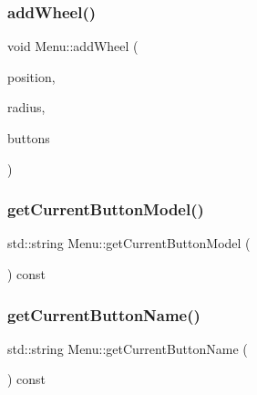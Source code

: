 \mbox{\label{class_menu_aaef68ff726b362a3807bfa0987430c69}} 
\subsubsection{\texorpdfstring{addWheel()}{addWheel()}\hspace{0.1cm}{\footnotesize\ttfamily [2/2]}}
{\footnotesize\ttfamily void Menu\+::add\+Wheel (\begin{DoxyParamCaption}\item[{const vector3df \&}]{position,  }\item[{const float \&}]{radius,  }\item[{const std\+::vector$<$ \mbox{\hyperlink{struct_wheel_1_1_param_button}{Wheel\+::\+Param\+Button}} $>$ \&}]{buttons }\end{DoxyParamCaption})}

\mbox{\label{class_menu_af6bbe099006c79f939910b1109be4ce5}} 
\subsubsection{\texorpdfstring{getCurrentButtonModel()}{getCurrentButtonModel()}}
{\footnotesize\ttfamily std\+::string Menu\+::get\+Current\+Button\+Model (\begin{DoxyParamCaption}{ }\end{DoxyParamCaption}) const}

\mbox{\label{class_menu_a82e1cb07e79c10467890b04d799d998d}} 
\subsubsection{\texorpdfstring{getCurrentButtonName()}{getCurrentButtonName()}}
{\footnotesize\ttfamily std\+::string Menu\+::get\+Current\+Button\+Name (\begin{DoxyParamCaption}{ }\end{DoxyParamCaption}) const}

\mbox{\label{class_menu_a2d80778321bd29e0ba8d17efd59eb6ff}} 
